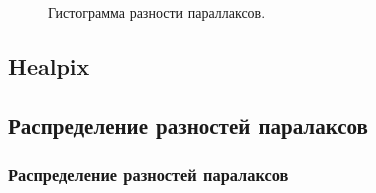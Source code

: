 \documentclass[14pt,aspectratio=43]{beamer}
\begin{document}
\begin{frame}[<alignment>]
\begin{figure}[h!]
\caption{Гистограмма разности параллаксов.}
\label{img:hist_par_deff}
\end{figure}
\end{frame}

\subsection{Healpix}\label{sub:smthhealpix}
\begin{frame}[<alignment>]


\begin{figure}[h!]
\label{img:healpix}
\end{figure}

\end{frame}	

\subsection{Распределение разностей паралаксов}\label{sub:smthhealpix}
\begin{frame}[<alignment>]
\frametitle{Распределение разностей паралаксов}

\end{frame}	
\end{document}
